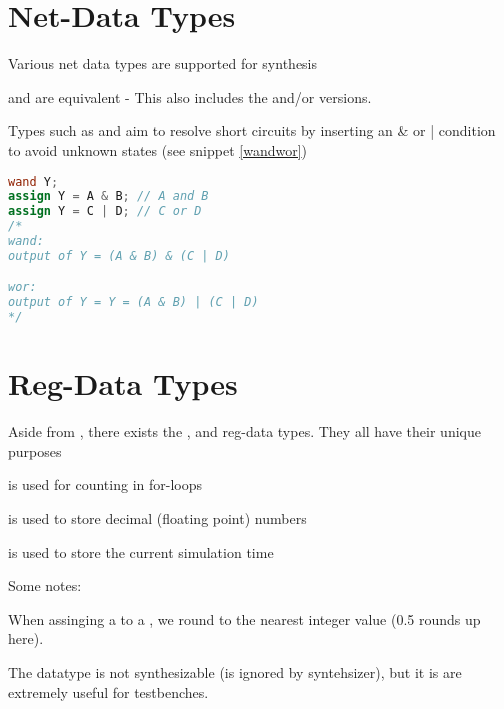 \section{Net-Data Types}
Various net data types are supported for synthesis
\begin{bullets}
	\item {} and  are equivalent - This also includes the and/or versions.
	\item Types such as  and  aim to resolve short circuits by inserting an \& or | condition to avoid unknown states (see snippet \ref{wandwor})
\end{bullets}

\begin{marginfigure}
	\begin{lstlisting}[language=Verilog, caption={wand and wor}, label=wandwor]
wand Y;
assign Y = A & B; // A and B
assign Y = C | D; // C or D
/* 
wand:
output of Y = (A & B) & (C | D)

wor:
output of Y = Y = (A & B) | (C | D)
*/
	\end{lstlisting}
\end{marginfigure}

\section{Reg-Data Types}
Aside from , there exists the ,  and  reg-data types. They all have their unique purposes
\begin{bullets}
	\item {} is used for counting in for-loops
	\item {} is used to store decimal (floating point) numbers
	\item {} is used to store the current simulation time
\end{bullets}

Some notes:
\begin{bullets}
	\item When assinging a  to a , we round to the nearest integer value (0.5 rounds up here).
	\item The  datatype is not synthesizable (is ignored by syntehsizer), but it is are extremely useful for testbenches.
\end{bullets}

